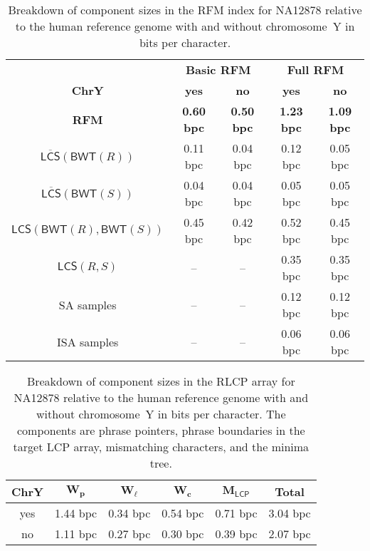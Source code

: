 \documentclass[a4paper,11pt]{llncs}
\renewcommand{\complement}[1]{\ensuremath{\overline{ #1 }}}
\newcommand{\SA}{\textsf{SA}}
\newcommand{\ISA}{\textsf{ISA}}
\newcommand{\RFM}{\textsf{RFM}}
\newcommand{\mBWT}{\ensuremath{\mathsf{BWT}}}
\newcommand{\LCP}{\textsf{LCP}}
\newcommand{\RLCP}{\textsf{RLCP}}
\newcommand{\mLCP}{\ensuremath{\mathsf{LCP}}}
\newcommand{\mLCS}{\ensuremath{\mathsf{LCS}}}
\newcommand{\mCS}{\ensuremath{\complement{\mathsf{LCS}}}}
\begin{document}
\begin{table}
\caption{Breakdown of component sizes in the \RFM{} index for NA12878 relative
to the human reference genome with and without chromosome~Y in bits per
character.}\label{table:rfm components}
\setlength{\extrarowheight}{2pt}
\setlength{\tabcolsep}{3pt}
\begin{center}
\begin{tabular}{c|cc|cc}
\hline
 & \multicolumn{2}{c|}{\textbf{Basic \RFM}} & \multicolumn{2}{c}{\textbf{Full
\RFM}} \\
\textbf{ChrY} & \textbf{yes} & \textbf{no} & \textbf{yes} & \textbf{no} \\
\hline
\textbf{\RFM}              & \textbf{0.60 bpc} & \textbf{0.50 bpc} &
\textbf{1.23 bpc} & \textbf{1.09 bpc} \\
$\mCS(\mBWT(R))$           &          0.11 bpc &          0.04 bpc &
0.12 bpc &          0.05 bpc \\
$\mCS(\mBWT(S))$           &          0.04 bpc &          0.04 bpc &
0.05 bpc &          0.05 bpc \\
$\mLCS(\mBWT(R),\mBWT(S))$ &          0.45 bpc &          0.42 bpc &
0.52 bpc &          0.45 bpc \\
$\mLCS(R,S)$               &                -- &                -- &
0.35 bpc &          0.35 bpc \\
\SA{} samples              &                -- &                -- &
0.12 bpc &          0.12 bpc \\
\ISA{} samples             &                -- &                -- &
0.06 bpc &          0.06 bpc \\
\hline
\end{tabular}
\end{center}
\end{table}

\begin{table}
\caption{Breakdown of component sizes in the \RLCP{} array for NA12878
relative to the human reference genome with and without chromosome~Y in bits
per character. The components are phrase pointers, phrase boundaries in the
target \LCP{} array, mismatching characters, and the minima
tree.}\label{table:rlcp components}
\setlength{\extrarowheight}{2pt}
\setlength{\tabcolsep}{3pt}
\begin{center}
\begin{tabular}{c|cccc|c}
\hline
\textbf{ChrY} & $\mathbf{W_{p}}$  & $\mathbf{W_{\ell}}$ & $\mathbf{W_{c}}$ &
$\mathbf{M_{\mLCP}}$ & \textbf{Total} \\
\hline
yes & 1.44 bpc & 0.34 bpc & 0.54 bpc & 0.71 bpc & 3.04 bpc \\
no  & 1.11 bpc & 0.27 bpc & 0.30 bpc & 0.39 bpc & 2.07 bpc \\
\hline
\end{tabular}
\end{center}
\end{table}
\end{document}
